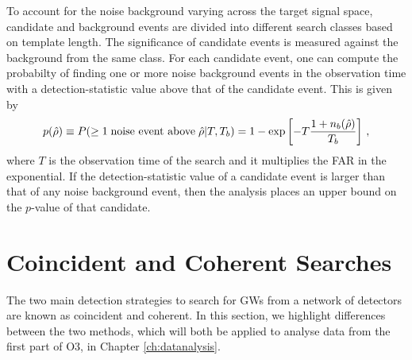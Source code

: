 \documentclass[binding=0.6cm, LaM]{sapthesis}
\begin{document}
	To account for the noise background varying across the target signal space, 
	candidate and background events are divided into different search classes based on template length. 
	The significance of candidate events is measured against the background from the same class. 
	For each candidate event, one can compute the probabilty of finding one or more 
	noise background events in the observation time with a detection-statistic value above that of the candidate event.  This is given by 
		\begin{equation}
			p(\hat \rho) \equiv P(\geq 1 \hspace*{0.1cm}\text{noise event above}\hspace*{0.1cm} \hat \rho|T,T_b) = 1 - \exp\left[-T{{1+n_b(\hat \rho)} \over{T_b}}\right]\,,
		\end{equation}
	where $T$ is the observation time of the search and it multiplies the FAR in the exponential.
	If the detection-statistic value of a candidate event is larger 
	than that of any noise background event, 
	then the analysis places an upper bound on the $p$-value of that candidate. 
	

\section{Coincident and Coherent Searches}

	The two main detection strategies to search for GWs 	
	from a network of detectors are known as coincident and coherent.  
	In this section, we highlight differences between the two methods, 
	which will both be applied to analyse data from the first part of O3, in Chapter \ref{ch:datanalysis}.  
\end{document}
